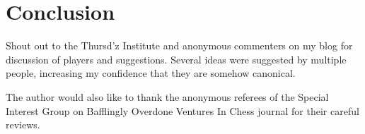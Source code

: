\documentclass[10pt,preprint,twocolumn]{acmart}
\begin{document}
%  



\section{Conclusion}

Shout out to the Thursd'z Institute and anonymous commenters
on my blog for discussion of players and suggestions. Several
ideas were suggested by multiple people, increasing my confidence
that they are somehow canonical.

The author would also like to thank the anonymous referees
of the Special Interest Group on
Bafflingly
Overdone
Ventures
In
Chess journal for their careful reviews.

% 

% 


\end{document}
